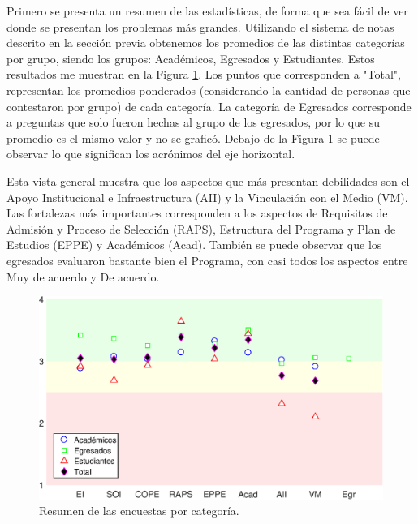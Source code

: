 Primero se presenta un resumen de las estadísticas, de forma que sea fácil de ver donde se 
presentan los problemas más grandes. Utilizando el sistema de notas descrito en la sección previa obtenemos 
los promedios de las distintas categorías por grupo, siendo los grupos: Académicos, Egresados y Estudiantes. 
Estos resultados me muestran en la Figura \ref{encuestas_fig}. Los puntos que corresponden a "Total", 
representan los promedios ponderados (considerando la cantidad de personas que contestaron por grupo) de cada 
categoría. La categoría de Egresados corresponde a preguntas que solo fueron hechas al grupo de los egresados,
por lo que su promedio es el mismo valor y no se graficó. Debajo de la Figura \ref{encuestas_fig} se puede observar
lo que significan los acrónimos del eje horizontal.

Esta vista general muestra que los aspectos que más presentan debilidades son el Apoyo Institucional e Infraestructura (AII) y
la Vinculación con el Medio (VM). Las fortalezas más importantes corresponden a los aspectos de Requisitos de Admisión y 
Proceso de Selección (RAPS), Estructura del Programa y Plan de Estudios (EPPE) y Académicos (Acad). También se puede 
observar que los egresados evaluaron bastante bien el Programa, con casi todos los aspectos entre Muy de acuerdo y De acuerdo.




\begin{figure}[!ht]
\centering
\includegraphics[width=0.8\columnwidth]{./pictures/encuestas.eps}
\caption{Resumen de las encuestas por categoría.}
\label{encuestas_fig}
\end{figure}

